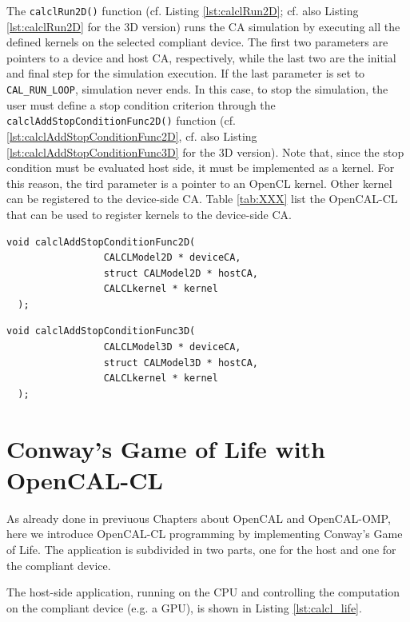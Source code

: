 The \verb'calclRun2D()' function (cf. Listing \ref{lst:calclRun2D};
cf. also Listing \ref{lst:calclRun2D} for the 3D version) runs the CA
simulation by executing all the defined kernels on the selected
compliant device. The first two parameters are pointers to a device
and host CA, respectively, while the last two are the initial and
final step for the simulation execution. If the last parameter is set
to \verb'CAL_RUN_LOOP', simulation never ends. In this case, to stop
the simulation, the user must define a stop condition criterion
through the \verb'calclAddStopConditionFunc2D()' function
(cf. \ref{lst:calclAddStopConditionFunc2D}, cf. also Listing
\ref{lst:calclAddStopConditionFunc3D} for the 3D version). Note that,
since the stop condition must be evaluated host side, it must be
implemented as a kernel. For this reason, the tird parameter is a
pointer to an OpenCL kernel. Other kernel can be registered to the
device-side CA. Table \ref{tab:XXX} list the OpenCAL-CL that can be
used to register kernels to the device-side CA.


\begin{lstlisting}[float,floatplacement=H, label=lst:calclAddStopConditionFunc2D, caption=The calclAddStopConditionFunc2D function., numbers=none]
  void calclAddStopConditionFunc2D(
                 CALCLModel2D * deviceCA,
                 struct CALModel2D * hostCA,
                 CALCLkernel * kernel
  );
\end{lstlisting}

\begin{lstlisting}[float,floatplacement=H, label=lst:calclAddStopConditionFunc3D, caption=The calclAddStopConditionFunc3D function., numbers=none]
  void calclAddStopConditionFunc3D(
                 CALCLModel3D * deviceCA,
                 struct CALModel3D * hostCA,
                 CALCLkernel * kernel
  );
\end{lstlisting}


\section{Conway's Game of Life with OpenCAL-CL}\label{sec:calcl_life}

As already done in previuous Chapters about OpenCAL and OpenCAL-OMP,
here we introduce OpenCAL-CL programming by implementing Conway's Game
of Life. The application is subdivided in two parts, one for the host
and one for the compliant device.

The host-side application, running on the CPU and controlling the
computation on the compliant device (e.g. a GPU), is shown in Listing
\ref{lst:calcl_life}.



